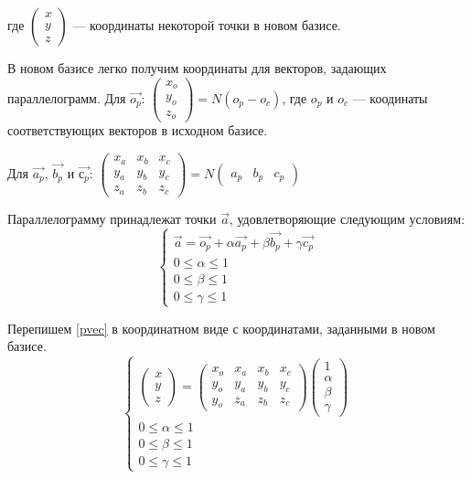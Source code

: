 \documentclass[pdftex,ptm,12pt,a4paper]{report}
\begin{document}
\begin{enumerate}
      где $\begin{pmatrix} x \\ y \\ z \end{pmatrix}$ --- координаты некоторой точки в новом базисе.

      В новом базисе легко получим координаты для векторов, задающих параллелограмм.
      Для $\vec{o_p}$: 
      $\begin{pmatrix} x_o \\ y_o \\ z_o \end{pmatrix} =  N (o_p - o_c) $, где $o_p$ и $o_c$ --- коодинаты соответствующих векторов в исходном базисе.

      Для $\vec{a_p}$, $\vec{b_p}$ и $\vec{с_p}$:
      $\begin{pmatrix} x_a & x_b & x_c \\ y_a & y_b & y_c  \\ z_a & z_b & z_c \end{pmatrix} = 
      N \begin{pmatrix} a_p & b_p  & c_p \end{pmatrix}$

      Параллелограмму принадлежат точки $\vec{a}$, удовлетворяющие следующим условиям:
      \begin{equation}\label{pvec}
        \begin{cases}
          \vec{a} = \vec{o_p} + \alpha \vec{a_p} + \beta \vec{b_p} + \gamma \vec{c_p} \\
          0 \le  \alpha   \le  1 \\
          0 \le  \beta   \le  1 \\
          0 \le  \gamma   \le  1 
        \end{cases}
      \end{equation}

      Перепишем \ref{pvec} в координатном виде с координатами, заданными в новом базисе.
      \begin{equation}\label{pcoord}
        \begin{cases}
          \begin{pmatrix} x \\ y \\ z \end{pmatrix}            
          =
          \begin{pmatrix} x_o & x_a & x_b & x_c \\ y_o & y_a & y_b & y_c  \\ y_o & z_a & z_b & z_c 
          \end{pmatrix} \begin {pmatrix} 1 \\ \alpha \\ \beta \\ \gamma \end{pmatrix} \\
          0 \le  \alpha   \le  1 \\
          0 \le  \beta   \le  1 \\
          0 \le  \gamma   \le  1 
        \end{cases}
      \end{equation}


\end{enumerate}
\end{document}

